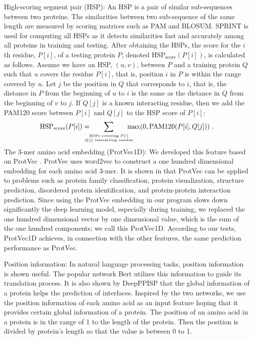 \documentclass{bioinfo}
\begin{document}
\begin{methods}
High-scoring segment pair (HSP): An HSP is a pair of similar sub-sequences between two proteins. The similarities between two sub-sequence of the same length are measured by scoring matrices such as PAM and BLOSUM. SPRINT \citep{li2017sprint} is used for computing all HSPs as it detects similarities fast and accurately among all proteins in training and testing. After obtaining the HSPs, the score for the $i$th residue, $P[i]$, of a testing protein $P$, denoted $\text{HSP}_{\text{score}}(P[i])$, is calculated as follows. Assume we have an HSP, $(u,v)$, between $P$ and a training protein $Q$ such that $u$ covers the residue $P[i]$, that is, position $i$ in $P$ is within the range covered by $u$. Let $j$ be the position in $Q$ that corresponds to $i$, that is, the distance in $P$ from the beginning of $u$ to $i$ is the same as the distance in $Q$ from the beginning of $v$ to $j$. If $Q[j]$ is a known interacting residue, then we add the PAM120 score between $P[i]$ and $Q[j]$ to the HSP score of $P[i]$:
\[
\text{HSP}_{\text{score}}(P[i]) = \!\!\!\!\!\!\sum_{\stackrel{\text{\tiny HSPs covering $P[i]$}}{\text{\tiny $Q[j]$ interacting residue}}}\!\!\!\!\!\! \max(0, \text{PAM120}(P[i], Q[j])) \ .
\]
The 3-mer amino acid embedding (ProtVec1D): We developed this feature based on ProtVec \citep{asgari2015continuous}. ProtVec uses word2vec \citep{mikolov2013distributed} to construct a one hundred dimensional embedding for each amino acid 3-mer. It is shown in \citep{asgari2015continuous} that ProtVec can be applied to problems such as protein family classification, protein visualization, structure prediction, disordered protein identification, and protein-protein interaction prediction. Since using the ProtVec embedding in our program slows down significantly the deep learning model, especially during training, we replaced the one hundred dimensional vector by one dimensional value, which is the sum of the one hundred components; we call this ProtVec1D. According to our tests, ProtVec1D achieves, in connection with the other features, the same prediction performance as ProtVec.

Position information: In natural language processing tasks, position information is shown useful. The popular network Bert \citep{devlin2018bert} utilizes this information to guide its translation process. It is also shown by DeepPPISP \citep{zeng2019protein} that the global information of a protein helps the prediction of interfaces. Inspired by the two networks, we use the position information of each amino acid as an input feature hoping that it provides certain global information of a protein. The position of an amino acid in a protein is in the range of 1 to the length of the protein. Then the position is divided by protein's length so that the value is between 0 to 1.


\end{methods}
\end{document}
